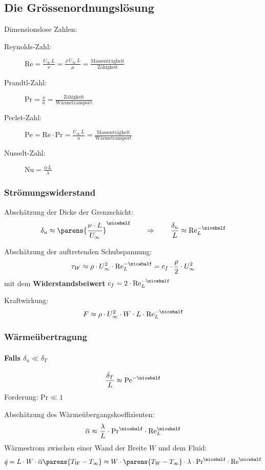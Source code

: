 	\subsection{Die Grössenordnungslösung} %
		Dimensionslose Zahlen:
		\begin{description}
			\item[Reynolds-Zahl:] $\mathrm{Re} = \frac{U_\infty \, L}{\nu} = \frac{\rho\, U_\infty \, L}{\mu} = \frac{\text{Massenträgheit}}{\text{Zähigkeit}}$
			\item[Prandtl-Zahl:] $\mathrm{Pr} = \frac{\nu}{a} = \frac{\text{Zähigkeit}}{\text{Wärmetransport}}$
			\item[Peclet-Zahl:] $\mathrm{Pe} = \mathrm{Re} \cdot \mathrm{Pr} = \frac{U_\infty \, L}{a} = \frac{\text{Massenträgheit}}{\text{Wärmetransport}}$
			\item[Nusselt-Zahl:] $\mathrm{Nu} = \frac{\overline\alpha \, L}{\lambda}$
		\end{description}

		\subsubsection{Strömungswiderstand} %
			Abschätzung der Dicke der Grenzschicht:
			\[
				\delta_u \approx \parens{
					\frac{\nu \cdot L}{U_\infty}
				}^{\nicehalf}
				\qquad \Rightarrow \qquad
				\frac {\delta_u} L \approx \mathrm{Re}_L^{-\nicehalf}
			\]

			Abschätzung der auftretenden Schubspannung:
			\[
				\tau_W \approx \rho \cdot U_\infty^2 \cdot \mathrm{Re}_L^{-\nicehalf} = c_f \cdot \frac \rho 2 \cdot U_\infty^2
			\]
			mit dem \textbf{Widerstandsbeiwert}
			$
				c_f = 2 \cdot \mathrm{Re}_L^{-\nicehalf}
			$

			Kraftwirkung:
			\[
				F \approx \rho \cdot U_\infty^2 \cdot W \cdot L \cdot \mathrm{Re}_L^{- \nicehalf}
			\]

		\subsubsection{Wärmeübertragung} %
			\paragraph{Falls $\delta_u \ll \delta_T$} %
				\[
					\frac{\delta_T}{L} \approx \mathrm{Pe}^{- \nicehalf}
				\]
				Forderung: $\mathrm{Pr} \ll 1$

				Abschätzung des Wärmeübergangskoeffizienten:
				\[
					\overline\alpha \approx \frac{\lambda}{L} \cdot \mathrm{Pr}^{\nicehalf} \cdot \mathrm{Re}_L^{\nicehalf}
				\]
				Wärmestrom zwischen einer Wand der Breite $W$ und dem Fluid:
				\[
					\dot q = L \cdot W \cdot \overline\alpha \parens{T_W - T_\infty}
					\approx W \cdot \parens{T_W - T_\infty} \cdot \lambda \cdot \mathrm{Pr}^{\nicehalf} \cdot \mathrm{Re}^{\nicehalf}
				\]

